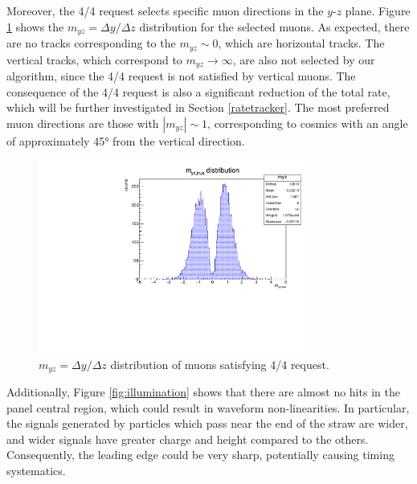 Moreover, the 4/4 request selects specific 
muon directions in the $y$-$z$ plane. 
Figure \ref{fig:myz} shows the 
$m_{yz}=\Delta y /\Delta z$ distribution for the selected muons. 
As expected, there are no tracks corresponding 
to the $m_{yz}\sim 0$, which are horizontal tracks. 
The vertical tracks, which correspond to 
$m_{yz} \rightarrow \infty$, are also 
not selected by our algorithm, since the 4/4 
request is not satisfied by vertical muons. 
The consequence of the 4/4 request is also a 
significant reduction of the total rate, 
which will be further investigated in 
Section \ref{ratetracker}. 
The most preferred muon  
directions are those with 
$|m_{yz}| \sim 1$, corresponding to 
cosmics with 
an angle of approximately 45° 
from the vertical direction.
\begin{figure}[!h]
    \centering
    \includegraphics[width =0.8\textwidth]{figures/pdf/myz.pdf}
    \caption[The $y-z$ direction 
    distribution of muons satisfying 4/4 request.]{
        $m_{yz}=\Delta y /\Delta z$  
    distribution of muons satisfying 4/4 request.}
    \label{fig:myz}
\end{figure}

Additionally, Figure \ref{fig:illumination} 
shows that there are almost no hits in the 
panel central region, which could result in 
waveform non-linearities.
In particular, the signals generated by 
particles which pass near the end of 
the straw are wider, and wider signals 
have greater charge and height compared 
to the others. Consequently, the leading 
edge could be very sharp, potentially 
causing timing systematics. 

